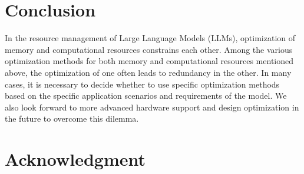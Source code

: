 \documentclass[conference]{IEEEtran}
\begin{document}
\section{Conclusion}
In the resource management of Large Language Models (LLMs), optimization of memory and computational resources constrains each other. Among the various optimization methods for both memory and computational resources mentioned above, the optimization of one often leads to redundancy in the other. In many cases, it is necessary to decide whether to use specific optimization methods based on the specific application scenarios and requirements of the model. We also look forward to more advanced hardware support and design optimization in the future to overcome this dilemma.

\section{Acknowledgment}
\end{document}
